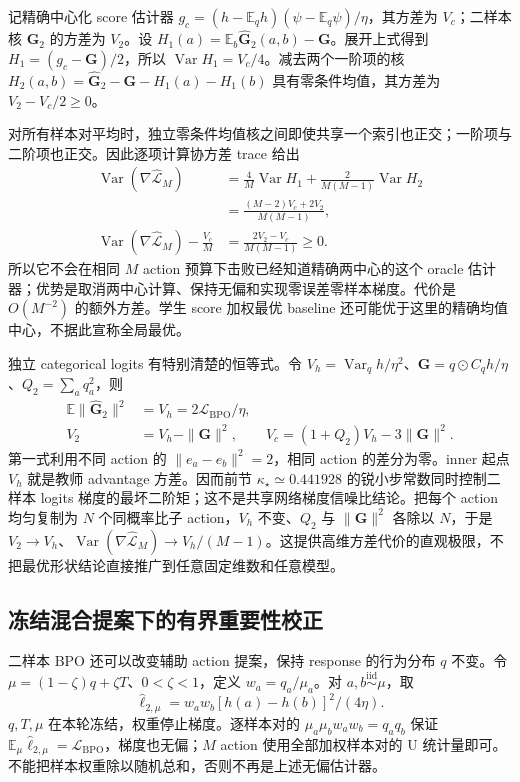 \documentclass[lang=cn,scheme=chinese,openany]{../book/elegantbook}
\newcommand{\E}{\mathbb E}
\newcommand{\Var}{\operatorname{Var}}
\begin{document}
记精确中心化 score 估计器 $g_c=(h-\E_qh)(\psi-\E_q\psi)/\eta$，其方差为 $V_c$；二样本核 $\widehat{\bm G}_2$ 的方差为 $V_2$。设 $H_1(a)=\E_b\widehat{\bm G}_2(a,b)-\bm G$。展开上式得到 $H_1=(g_c-\bm G)/2$，所以 $\Var H_1=V_c/4$。减去两个一阶项的核 $H_2(a,b)=\widehat{\bm G}_2-\bm G-H_1(a)-H_1(b)$ 具有零条件均值，其方差为 $V_2-V_c/2\ge0$。

对所有样本对平均时，独立零条件均值核之间即使共享一个索引也正交；一阶项与二阶项也正交。因此逐项计算协方差 trace 给出
\begin{align}
 \Var(\nabla\widehat{\mathcal L}_M)
 &=\frac{4}{M}\Var H_1+\frac{2}{M(M-1)}\Var H_2\\
 &=\frac{(M-2)V_c+2V_2}{M(M-1)},\\
 \Var(\nabla\widehat{\mathcal L}_M)-\frac{V_c}{M}
 &=\frac{2V_2-V_c}{M(M-1)}\ge0.
 \label{eq:center-free-variance-cost}
\end{align}
所以它不会在相同 $M$ action 预算下击败已经知道精确两中心的这个 oracle 估计器；优势是取消两中心计算、保持无偏和实现零误差零样本梯度。代价是 $O(M^{-2})$ 的额外方差。学生 score 加权最优 baseline 还可能优于这里的精确均值中心，不据此宣称全局最优。

独立 categorical logits 有特别清楚的恒等式。令 $V_h=\Var_qh/\eta^2$、$\bm G=q\odot C_qh/\eta$、$Q_2=\sum_aq_a^2$，则
\begin{align}
 \E\|\widehat{\bm G}_2\|^2&=V_h=2\mathcal L_{\mathrm{BPO}}/\eta,\\
 V_2&=V_h-\|\bm G\|^2,\qquad
 V_c=(1+Q_2)V_h-3\|\bm G\|^2.
\end{align}
第一式利用不同 action 的 $\|e_a-e_b\|^2=2$，相同 action 的差分为零。inner 起点 $V_h$ 就是教师 advantage 方差。因而前节 $\kappa_\star\simeq0.441928$ 的锐小步常数同时控制二样本 logits 梯度的最坏二阶矩；这不是共享网络梯度信噪比结论。把每个 action 均匀复制为 $N$ 个同概率比子 action，$V_h$ 不变、$Q_2$ 与 $\|\bm G\|^2$ 各除以 $N$，于是 $V_2\to V_h$、$\Var(\nabla\widehat{\mathcal L}_M)\to V_h/(M-1)$。这提供高维方差代价的直观极限，不把最优形状结论直接推广到任意固定维数和任意模型。
\subsection{冻结混合提案下的有界重要性校正}

二样本 BPO 还可以改变辅助 action 提案，保持 response 的行为分布 $q$ 不变。令 $\mu=(1-\zeta)q+\zeta T$、$0<\zeta<1$，定义 $w_a=q_a/\mu_a$。对 $a,b\overset{\mathrm{iid}}\sim\mu$，取
\begin{equation}
 \widehat\ell_{2,\mu}=w_aw_b[h(a)-h(b)]^2/(4\eta).
\end{equation}
$q,T,\mu$ 在本轮冻结，权重停止梯度。逐样本对的 $\mu_a\mu_bw_aw_b=q_aq_b$ 保证 $\E_\mu\widehat\ell_{2,\mu}=\mathcal L_{\mathrm{BPO}}$，梯度也无偏；$M$ action 使用全部加权样本对的 U 统计量即可。不能把样本权重除以随机总和，否则不再是上述无偏估计器。
\end{document}
